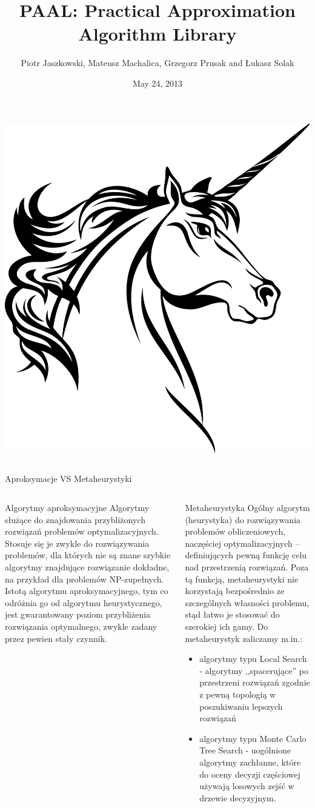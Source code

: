 \documentclass[final,hyperref={pdfpagelabels=false}]{beamer}
\title{\huge PAAL: Practical Approximation Algorithm Library}
\author{Piotr Jaszkowski, Mateusz Machalica, Grzegorz Prusak and Łukasz Solak}
\institute[University of Warsaw]{The Faculty of Mathematics, Informatics and Mechanics, University of Warsaw, Warsaw, Poland}
\date[May 24, 2013]{May 24, 2013}
\begin{document}
\begin{frame}

  \begin{center}
    \includegraphics[width=.25\linewidth]{unicorn}
  \end{center}
	\begin{columns}
		\begin{column}{.96\textwidth}
			\vspace{1cm}
			\begin{center}
			\veryHuge Aproksymacje VS Metaheurystyki
			\end{center}
			\vspace{1cm}
		\end{column}
	\end{columns}

	\begin{columns}
		\begin{column}{.46\textwidth}
			\begin{block}{Algorytmy aproksymacyjne}
        Algorytmy służące do znajdowania przybliżonych rozwiązań problemów optymalizacyjnych. Stosuje się je zwykle do rozwiązywania problemów, dla których nie
        są znane szybkie algorytmy znajdujące rozwiązanie dokładne, na przykład dla problemów NP-zupełnych.  Istotą algorytmu aproksymacyjnego, tym co odróżnia
        go od algorytmu heurystycznego, jest gwarantowany poziom przybliżenia rozwiązania optymalnego, zwykle zadany przez pewien stały czynnik.  \vspace{5cm}
			\end{block}
		\end{column}

		\begin{column}{.46\textwidth}
      \begin{block}{Metaheurystyka}
        Ogólny algorytm (heurystyka) do rozwiązywania problemów obliczeniowych, naczęściej optymalizacyjnych -- definiujących pewną funkcję celu nad
        przestrzenią rozwiązań. Poza tą funkcją, metaheurystyki nie korzystają bezpośrednio ze szczególnych własności problemu, stąd łatwo je stosować do
        szerokiej ich gamy. Do metaheurystyk zaliczamy m.in.:
				\begin{itemize}
        \item algorytmy typu Local Search - algorytmy ,,spacerujące'' po przestrzeni rozwiązań zgodnie z pewną topologią w poszukiwaniu lepszych rozwiązań
        \item algorytmy typu Monte Carlo Tree Search - uogólnione algorytmy zachłanne, które do oceny decyzji częściowej używają losowych zejść w drzewie
          decyzyjnym.
				\end{itemize}
			\end{block}
		\end{column}
	\end{columns}
	

\end{frame}
\end{document}
